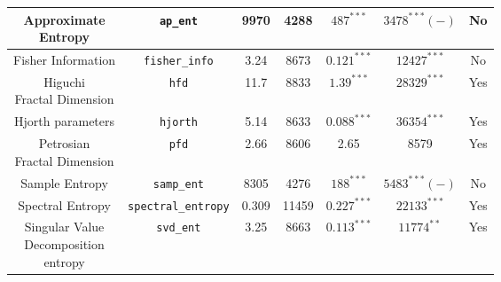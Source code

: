 \begin {table}[!h]
\begin{center}
\begin{tabular}{|c|c|c|c|c|c|c|}
  \hline
  \hline
\specialcell{Approximate\\Entropy} & \texttt{ap\_ent} &                                     9970 & 4288 & $487^{***}$ & $3478^{***}(-)$ & No\\
\hline
Fisher Information & \texttt{fisher\_info} &                                 3.24 & 8673 & $0.121^{***}$ & $12427^{***}$ & No\\
\hline
\specialcell{Higuchi\\Fractal Dimension} & \texttt{hfd} &                     11.7 & 8833 & $1.39^{***}$ & $28329^{***}$ & Yes\\
\hline
Hjorth parameters & \texttt{hjorth} &                                         5.14 & 8633 & $0.088^{***}$ & $36354^{***}$ & Yes\\
\hline
\specialcell{Petrosian\\Fractal Dimension} & \texttt{pfd} &                 2.66 & 8606 & 2.65 & 8579 & Yes\\
\hline
Sample Entropy & \texttt{samp\_ent} &                                         8305 & 4276 & $188^{***}$ & $5483^{***}(-)$ & No\\
\hline
Spectral Entropy & \texttt{spectral\_entropy} &                                 0.309 & 11459 & $0.227^{***}$ & $22133^{***}$ & Yes\\
\hline
\specialcell[l]{Singular Value \\Decomposition\\ entropy} & \texttt{svd\_ent} &     3.25 & 8663 & $0.113^{***}$ & $11774^{**}$ & Yes\\
 \hline
\end{tabular}
\end{center}
\end{table}
